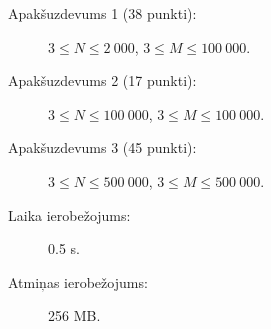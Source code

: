 \documentclass{boi2014-lv}
\begin{document}
    \Scoring

    \begin{description}
        \item[Apakšuzdevums 1 (38 punkti):] $3 \le N \le 2\ 000$, $3 \le M \le 100\ 000$.
        \item[Apakšuzdevums 2 (17 punkti):] $3 \le N \le 100\ 000$, $3 \le M \le 100\ 000$.
        \item[Apakšuzdevums 3 (45 punkti):] $3 \le N \le 500\ 000$, $3 \le M \le 500\ 000$.
    \end{description}

    \Constraints

    \begin{description}
        \item[Laika ierobežojums:] 0.5 s.
        \item[Atmiņas ierobežojums:] 256 MB.
    \end{description}
\end{document}
